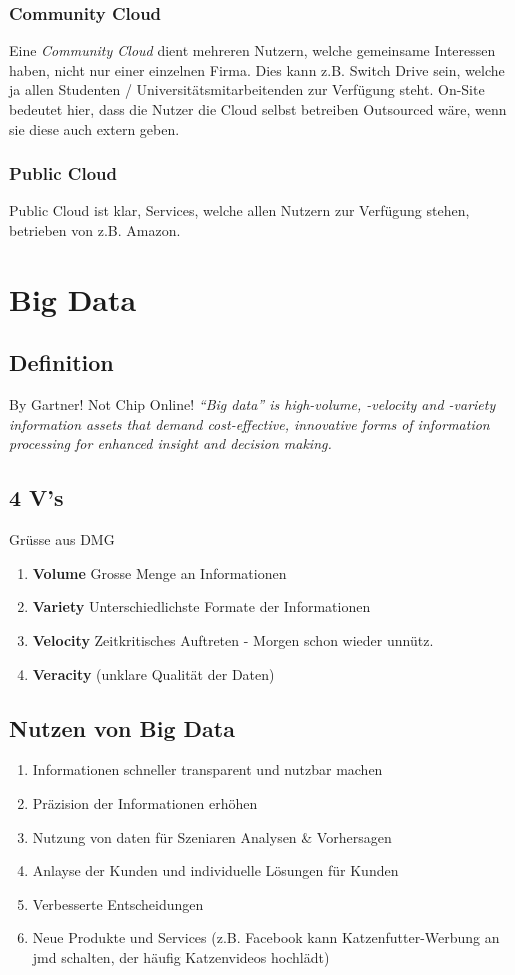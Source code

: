 \subsubsection{Community Cloud}
Eine \textit{Community Cloud} dient mehreren Nutzern, welche gemeinsame Interessen haben, nicht nur einer einzelnen Firma. Dies kann z.B. Switch Drive sein, welche ja allen Studenten / Universitätsmitarbeitenden zur Verfügung steht. On-Site bedeutet hier, dass die Nutzer die Cloud selbst betreiben Outsourced wäre, wenn sie diese auch extern geben.
\subsubsection{Public Cloud}
Public Cloud ist klar, Services, welche allen Nutzern zur Verfügung stehen, betrieben von z.B. Amazon.
\section{Big Data}
\subsection{Definition}
By Gartner! Not Chip Online!
\textit{“Big data” is high-volume, -velocity and -variety information assets that demand cost-effective, innovative forms of information processing for enhanced insight and decision making.}
\subsection{4 V's}
Grüsse aus DMG
\begin{enumerate}
	\item \textbf{Volume} Grosse Menge an Informationen
	\item \textbf{Variety} Unterschiedlichste Formate der Informationen
	\item \textbf{Velocity} Zeitkritisches Auftreten - Morgen schon wieder unnütz.
	\item \textbf{Veracity} (unklare Qualität der Daten)
\end{enumerate}
\subsection{Nutzen von Big Data}
\begin{enumerate}
	\item Informationen schneller transparent und nutzbar machen
	\item Präzision der Informationen erhöhen
	\item Nutzung von daten für Szeniaren Analysen \& Vorhersagen
	\item Anlayse der Kunden und individuelle Lösungen für Kunden
	\item Verbesserte Entscheidungen
	\item Neue Produkte und Services (z.B. Facebook kann Katzenfutter-Werbung an jmd schalten, der häufig Katzenvideos hochlädt)
\end{enumerate}
